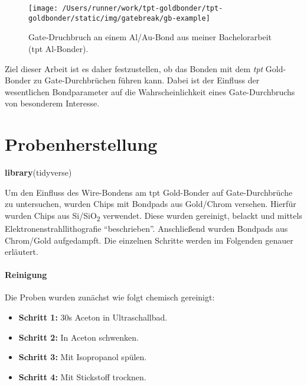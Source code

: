 \documentclass[
  paper=a4,
  ,captions=tableheading
]{scrartcl}
\newenvironment{Shaded}{\begin{snugshade}}{\end{snugshade}}
\newcommand{\KeywordTok}[1]{\textcolor[rgb]{0.13,0.29,0.53}{\textbf{#1}}}
\newcommand{\NormalTok}[1]{#1}
\providecommand{\tightlist}{%
  \setlength{\itemsep}{0pt}\setlength{\parskip}{0pt}}
\begin{document}
\begin{figure}

{\centering \texttt{[image: /Users/runner/work/tpt-goldbonder/tpt-goldbonder/static/img/gatebreak/gb-example]} 

}

\caption{Gate-Druchbruch an einem Al/Au-Bond aus meiner Bachelorarbeit (tpt Al-Bonder).}\label{fig:gatebreak-image}
\end{figure}

Ziel dieser Arbeit ist es daher festzustellen, ob das Bonden mit dem \emph{tpt} Gold-Bonder zu Gate-Durchbrüchen führen kann. Dabei ist der Einfluss der wesentlichen Bondparameter auf die Wahrscheinlichkeit eines Gate-Durchbruchs von besonderem Interesse.

\hypertarget{sample-prep}{%
\section{Probenherstellung}\label{sample-prep}}

\begin{Shaded}
\begin{Highlighting}[]
\KeywordTok{library}\NormalTok{(tidyverse)}
\end{Highlighting}
\end{Shaded}

Um den Einfluss des Wire-Bondens am tpt Gold-Bonder auf Gate-Durchbrüche zu untersuchen, wurden Chips mit Bondpads aus Gold/Chrom versehen. Hierfür wurden Chips aus Si/SiO\textsubscript{2} verwendet. Diese wurden gereinigt, belackt und mittels Elektronenstrahllithografie \enquote{beschrieben}. Anschließend wurden Bondpads aus Chrom/Gold aufgedampft. Die einzelnen Schritte werden im Folgenden genauer erläutert.

\hypertarget{reinigung}{%
\paragraph{Reinigung}\label{reinigung}}

Die Proben wurden zunächst wie folgt chemisch gereinigt:

\begin{itemize}
\tightlist
\item
  \textbf{Schritt 1:} 30s Aceton in Ultraschallbad.
\item
  \textbf{Schritt 2:} In Aceton schwenken.
\item
  \textbf{Schritt 3:} Mit Isopropanol spülen.
\item
  \textbf{Schritt 4:} Mit Stickstoff trocknen.
\end{itemize}
\end{document}
